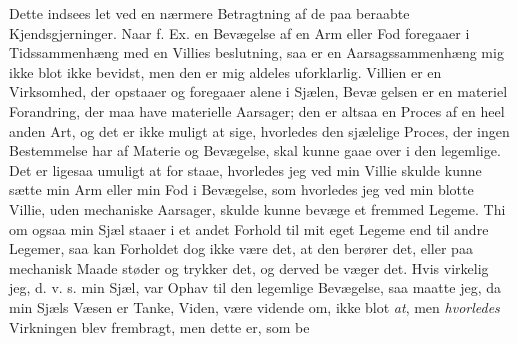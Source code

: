 \documentclass[12pt,a4paper]{book}
\begin{document}
Dette indsees let ved en nærmere Betragtning af de paa\-%
beraabte Kjendsgjerninger. Naar f. Ex. en Bevægelse af en
Arm eller Fod foregaaer i Tidssammenhæng med en Villies\-%
beslutning, saa er en Aarsagssammenhæng mig ikke blot ikke
bevidst, men den er mig aldeles uforklarlig. Villien er en
Virksomhed, der opstaaer og foregaaer alene i Sjælen, Bevæ\-%
gelsen er en materiel Forandring, der maa have materielle
Aarsager; den er altsaa en Proces af en heel anden Art, og
det er ikke muligt at sige, hvorledes den sjælelige Proces, der
ingen Bestemmelse har af Materie og Bevægelse, skal kunne
gaae over i den legemlige. Det er ligesaa umuligt at for\-%
staae, hvorledes jeg ved min Villie skulde kunne sætte min
Arm eller min Fod i Bevægelse, som hvorledes jeg ved min
blotte Villie, uden mechaniske Aarsager, skulde kunne bevæge
et fremmed Legeme. Thi om ogsaa min Sjæl staaer i et
andet Forhold til mit eget Legeme end til andre Legemer,
saa kan Forholdet dog ikke være det, at den berører det, eller
paa mechanisk Maade støder og trykker det, og derved be\-%
væger det. Hvis virkelig jeg, d. v. s. min Sjæl, var Ophav
til den legemlige Bevægelse, saa maatte jeg, da min Sjæls
Væsen er Tanke, Viden, være vidende om, ikke blot \emph{at}, men
\emph{hvorledes} Virkningen blev frembragt, men dette er, som be\-%
\end{document}
